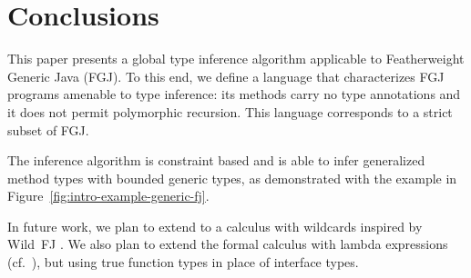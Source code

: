 \section{Conclusions}
\label{sec:conclusions}

This paper presents a global type inference algorithm applicable to
Featherweight Generic Java (FGJ). To this end, we define a language
\FGJGT that characterizes FGJ programs amenable to type inference: its
methods carry no type annotations and it does not permit polymorphic recursion.
This language corresponds to a strict subset of FGJ.

The inference algorithm is constraint based and is able to infer
generalized method types with bounded generic types, as demonstrated
with the example in Figure~\ref{fig:intro-example-generic-fj}.

In future work, we plan to extend \FGJGT to a calculus with wildcards
inspired by Wild~FJ \cite{TEP05}. 
We also plan to extend the formal calculus with lambda expressions
(cf.\ \cite{BBDGV18}), but using true function types in place of
interface types.


